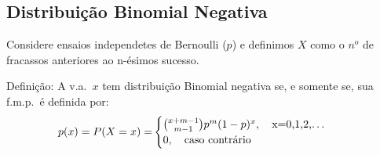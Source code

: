 \documentclass[11pt,a4paper]{book}
\begin{document}
      \subsection{Distribuição Binomial Negativa}
      \begin{description}
      Considere ensaios independetes de Bernoulli ($p$) e definimos $X$ como o $n^o$ 
      de fracassos anteriores ao n-ésimos sucesso.

    \item{Definição}: A v.a.\ $x$ tem distribuição Binomial negativa se, e somente se,
      sua f.m.p.\ é definida por:
      \begin{align}
        p(x)=P(X=x)=&
        \begin{cases}
          \binom{x+m-1}{m-1} p^m (1-p)^x, \text{\quad x=0,1,2,\dots} \\
          0, \text{\quad caso contrário}
        \end{cases}
      \end{align}
 \end{description}
 
\end{document}
